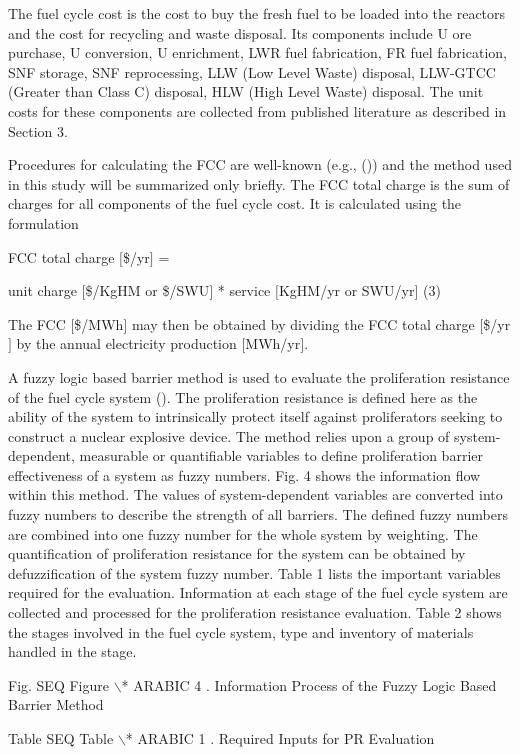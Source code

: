 	The fuel cycle cost is the cost to buy the fresh fuel to be loaded into
the reactors and the cost for recycling and waste disposal.  Its
components include U ore purchase, U conversion, U enrichment, LWR fuel
fabrication, FR fuel fabrication, SNF storage, SNF reprocessing, LLW
(Low Level Waste) disposal, LLW-GTCC (Greater than Class C) disposal,
HLW (High Level Waste) disposal. The unit costs for these components are
collected from published literature as described in Section 3. 

	Procedures for calculating the FCC are well-known (e.g., ()) and the
method used in this study will be summarized only briefly.  The FCC
total charge is the sum of charges for all components of the fuel cycle
cost.  It is calculated using the formulation

FCC total charge $[$\$/yr$]$ = 

 unit charge $[$\$/KgHM or \$/SWU$]$ * service $[$KgHM/yr or SWU/yr$]$  
    (3)

The FCC $[$\$/MWh$]$ may then be obtained by dividing the FCC total
charge $[$\$/yr$]$ by the annual electricity production $[$MWh/yr$]$.

	A fuzzy logic based barrier method is used to evaluate the
proliferation resistance of the fuel cycle system (). The proliferation
resistance is defined here as the ability of the system to intrinsically
protect itself against proliferators seeking to construct a nuclear
explosive device. The method relies upon a group of system-dependent,
measurable or quantifiable variables to define proliferation barrier
effectiveness of a system as fuzzy numbers. Fig. 4 shows the information
flow within this method. The values of system-dependent variables are
converted into fuzzy numbers to describe the strength of all barriers.
The defined fuzzy numbers are combined into one fuzzy number for the
whole system by weighting. The quantification of proliferation
resistance for the system can be obtained by defuzzification of the
system fuzzy number. Table 1 lists the important variables required for
the evaluation. Information at each stage of the fuel cycle system are
collected and processed for the proliferation resistance evaluation.
Table 2 shows the stages involved in the fuel cycle system, type and
inventory of materials handled in the stage.

Fig.   SEQ Figure $\backslash$* ARABIC  4 .  Information Process of the
Fuzzy Logic Based Barrier Method

Table   SEQ Table $\backslash$* ARABIC  1 . Required Inputs for PR
Evaluation


